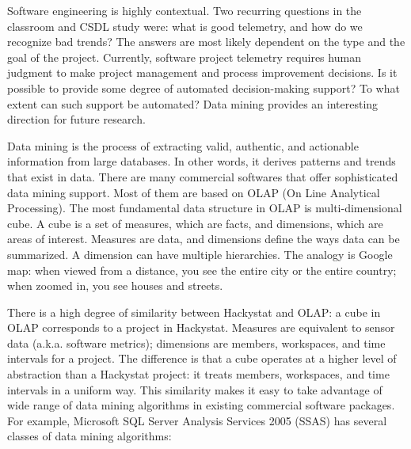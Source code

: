
Software engineering is highly contextual. Two recurring questions in the classroom and CSDL study were: what is good telemetry, and how do we recognize bad trends? The answers are most likely dependent on the type and the goal of the project. Currently, software project telemetry requires human judgment to make project management and process improvement decisions. Is it possible to provide some degree of automated decision-making support? To what extent can such support be automated? Data mining provides an interesting direction for future research.

Data mining is the process of extracting valid, authentic, and actionable information from large databases. In other words, it derives patterns and trends that exist in data. There are many commercial softwares that offer sophisticated data mining support. Most of them are based on OLAP (On Line Analytical Processing). The most fundamental data structure in OLAP is multi-dimensional cube. A cube is a set of measures, which are facts, and dimensions, which are areas of interest. Measures are data, and dimensions define the ways data can be summarized. A dimension can have multiple hierarchies. The analogy is Google map: when viewed from a distance, you see the entire city or the entire country; when zoomed in, you see houses and streets. 

There is a high degree of similarity between Hackystat and OLAP: a cube in OLAP corresponds to a project in Hackystat. Measures are equivalent to sensor data (a.k.a. software metrics); dimensions are members, workspaces, and time intervals for a project. The difference is that a cube operates at a higher level of abstraction than a Hackystat project: it treats members, workspaces, and time intervals in a uniform way. This similarity makes it easy to take advantage of wide range of data mining algorithms in existing commercial software packages. For example, Microsoft SQL Server Analysis Services 2005 (SSAS) has several classes of data mining algorithms:

